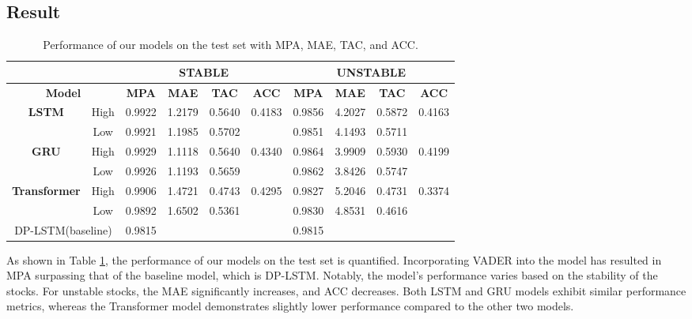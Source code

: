 \subsection{Result}


\begin{table}[h]
	\label{tab:result}
	\centering
	\begin{tabular}{c|c|c|c|c|c|c|c|c|c}
	\toprule\toprule
	\multicolumn{2}{c}{}& \multicolumn{4}{|c|}{\textbf{STABLE}} & \multicolumn{4}{c}{\textbf{UNSTABLE}} \\
	\midrule
	\multicolumn{2}{c|}{\textbf{Model}} & \textbf{MPA} & \textbf{MAE} & \textbf{TAC} & \textbf{ACC} & \textbf{MPA} & \textbf{MAE} & \textbf{TAC} & \textbf{ACC} \\ 
	\midrule
	\multirow{ 2}{*}{\textbf{LSTM}} & High			& 	0.9922& 	1.2179& 	0.5640& \multirow{ 2}{*}{0.4183}
					  								& 	0.9856& 	4.2027& 	0.5872& \multirow{ 2}{*}{0.4163}	\\ 
									& Low			& 	0.9921& 	1.1985& 	0.5702& 
					  								& 	0.9851& 	4.1493& 	0.5711& 							\\ 
	\multirow{ 2}{*}{\textbf{GRU}} 	& High			& 	0.9929& 	1.1118& 	0.5640& \multirow{ 2}{*}{0.4340}	
													& 	0.9864& 	3.9909& 	0.5930& \multirow{ 2}{*}{0.4199} 	\\ 
									& Low			& 	0.9926& 	1.1193& 	0.5659& 	
													& 	0.9862& 	3.8426& 	0.5747& 							\\ 
	\multirow{ 2}{*}{\textbf{Transformer}} 	& High	& 	0.9906& 	1.4721& 	0.4743& \multirow{ 2}{*}{0.4295}	
													& 	0.9827& 	5.2046& 	0.4731& \multirow{ 2}{*}{0.3374} 	\\ 
											& Low	& 	0.9892& 	1.6502& 	0.5361& 
													& 	0.9830& 	4.8531& 	0.4616& 							\\ 
	\midrule
	\multicolumn{ 2}{c|}{DP-LSTM(baseline)}			& 	0.9815& 		 & 		 & 	
					  								& 	0.9815& 		 & 		 & 									\\
	\bottomrule
	\bottomrule
	\end{tabular}
	\caption{Performance of our models on the test set with MPA, MAE, TAC, and ACC.}
\end{table}
As shown in Table \ref{tab:result}, the performance of our models on the test set is quantified. Incorporating VADER into the model has resulted in MPA surpassing that of the baseline model, which is DP-LSTM. 
Notably, the model's performance varies based on the stability of the stocks. For unstable stocks, the MAE significantly increases, and ACC decreases.
Both LSTM and GRU models exhibit similar performance metrics, whereas the Transformer model demonstrates slightly lower performance compared to the other two models. 
